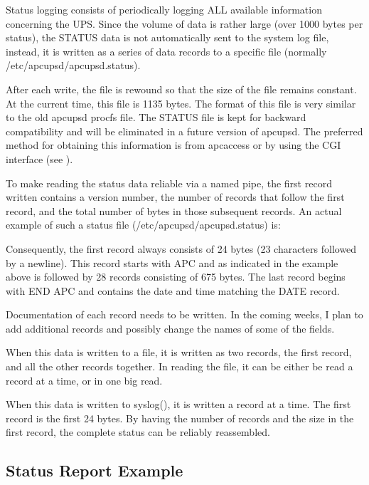 {{{{{{{{{{{{{Status logging consists of periodically logging ALL available information
concerning the UPS. Since the volume of data is rather large (over 1000 bytes
per status), the STATUS data is not automatically sent to the system log file,
instead, it is written as a series of data records to a specific file
(normally /etc/apcupsd/apcupsd.status).  

After each write, the file is rewound so that the size of the file remains
constant. At the current time, this file is 1135 bytes. The format of this
file is very similar to the old apcupsd procfs file. The STATUS file is kept
for backward compatibility and will be eliminated in a future version of
apcupsd. The preferred method for obtaining this information is from apcaccess
or by using the CGI interface (see 
).  

To make reading the status data reliable via a named pipe, the first record
written contains a version number, the number of records that follow the first
record, and the total number of bytes in those subsequent records. An actual
example of such a status file (/etc/apcupsd/apcupsd.status) is:  

Consequently, the first record always consists of 24 bytes (23 characters
followed by a newline). This record starts with APC and as indicated in the
example above is followed by 28 records consisting of 675 bytes. The last
record begins with END APC and contains the date and time matching the DATE
record.  

Documentation of each record needs to be written. In the coming weeks, I plan
to add additional records and possibly change the names of some of the fields.
 

When this data is written to a file, it is written as two records, the first
record, and all the other records together. In reading the file, it can be
either be read a record at a time, or in one big read.  

When this data is written to syslog(), it is written a record at a time. The
first record is the first 24 bytes. By having the number of records and the
size in the first record, the complete status can be reliably reassembled. 

\label{Status-Report-Example}

\subsection*{Status Report Example}

}}}}}}}}}}}}}
